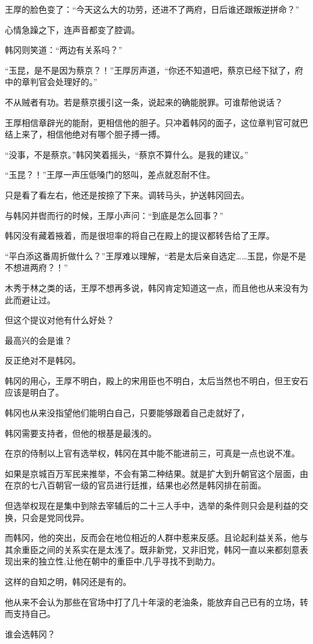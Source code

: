 王厚的脸色变了：“今天这么大的功劳，还进不了两府，日后谁还跟叛逆拼命？”

心情急躁之下，连声音都变了腔调。

韩冈则笑道：“两边有关系吗？”

“玉昆，是不是因为蔡京？！”王厚厉声道，“你还不知道吧，蔡京已经下狱了，府中的章判官会处理好的。”

不从贼者有功。若是蔡京援引这一条，说起来的确能脱罪。可谁帮他说话？

王厚相信章辟光的能耐，更相信他的胆子。只冲着韩冈的面子，这位章判官可就巴结上来了，相信他绝对有哪个胆子搏一搏。

“没事，不是蔡京。”韩冈笑着摇头，“蔡京不算什么。是我的建议。”

“玉昆？！”王厚一声压低嗓门的怒叫，差点就忍耐不住。

只是看了看左右，他还是按捺了下来。调转马头，护送韩冈回去。

与韩冈并辔而行的时候，王厚小声问：“到底是怎么回事？”

韩冈没有藏着掖着，而是很坦率的将自己在殿上的提议都转告给了王厚。

“平白添这番周折做什么？”王厚难以理解，“若是太后亲自选定……玉昆，你是不是不想进两府？！”

木秀于林之类的话，王厚不想再多说，韩冈肯定知道这一点，而且他也从来没有为此而避让过。

但这个提议对他有什么好处？

最高兴的会是谁？

反正绝对不是韩冈。

韩冈的用心，王厚不明白，殿上的宋用臣也不明白，太后当然也不明白，但王安石应该是明白了。

韩冈也从来没指望他们能明白自己，只要能够跟着自己走就好了，

韩冈需要支持者，但他的根基是最浅的。

在京的侍制以上官有选举权，韩冈在其中能不能进前三，可真是一点也说不准。

如果是京城百万军民来推举，不会有第二种结果。就是扩大到升朝官这个层面，由在京的七八百朝官一级的官员进行廷推，结果也必然是韩冈排在前面。

但选举权现在是集中到除去宰辅后的二十三人手中，选举的条件则只会是利益的交换，只会是党同伐异。

而韩冈，他的突出，反而会在地位相近的人群中惹来反感。且论起利益关系，他与其余重臣之间的关系实在是太浅了。既非新党，又非旧党，韩冈一直以来都刻意表现出来的独立性,让他在朝中的重臣中,几乎寻找不到助力。

这样的自知之明，韩冈还是有的。

他从来不会认为那些在官场中打了几十年滚的老油条，能放弃自己已有的立场，转而支持自己。

谁会选韩冈？

